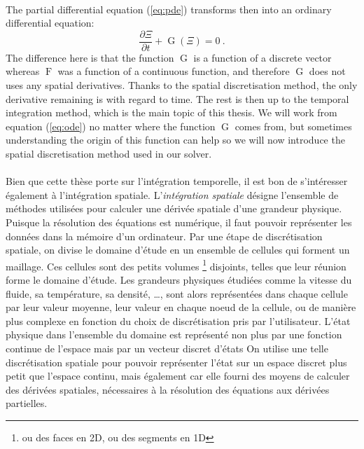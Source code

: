     \paragraph{}
    The partial differential equation (\ref{eq:pde}) transforms then into an ordinary differential equation:
    \begin{equation}\label{eq:ode}
      \frac{\partial \Xi}{\partial t} + \operatorname{G}\left(\Xi\right) = 0 \ .
    \end{equation}
    The difference here is that the function $\operatorname{G}$ is a function of a discrete vector whereas $\operatorname{F}$ was a function of a continuous function, and therefore $\operatorname{G}$ does not uses any spatial derivatives.
    Thanks to the spatial discretisation method, the only derivative remaining is with regard to time.
    The rest is then up to the temporal integration method, which is the main topic of this thesis.
    We will work from equation (\ref{eq:ode}) no matter where the function $\operatorname{G}$ comes from, but sometimes understanding the origin of this function can help so we will now introduce the spatial discretisation method used in our solver.



    \paragraph{}
    Bien que cette thèse porte sur l'intégration temporelle, il est bon de s'intéresser également à l'intégration spatiale.
    L'\emph{intégration spatiale} désigne l'ensemble de méthodes utilisées pour calculer une dérivée spatiale d'une grandeur physique.
    Puisque la résolution des équations est numérique, il faut pouvoir représenter les données dans la mémoire d'un ordinateur.
    Par une étape de discrétisation spatiale, on divise le domaine d'étude en un ensemble de cellules qui forment un maillage.
    Ces cellules sont des petits volumes \footnote{ou des faces en 2D, ou des segments en 1D} disjoints, telles que leur réunion forme le domaine d'étude.
    Les grandeurs physiques étudiées comme la vitesse du fluide, sa température, sa densité, \dots, sont alors représentées dans chaque cellule par leur valeur moyenne, leur valeur en chaque noeud de la cellule, ou de manière plus complexe en fonction du choix de discrétisation pris par l'utilisateur.
    L'état physique dans l'ensemble du domaine est représenté non plus par une fonction continue de l'espace mais par un vecteur discret d'états
    On utilise une telle discrétisation spatiale pour pouvoir représenter l'état sur un espace discret plus petit que l'espace continu, mais également car elle fourni des moyens de calculer des dérivées spatiales, nécessaires à la résolution des équations aux dérivées partielles.


